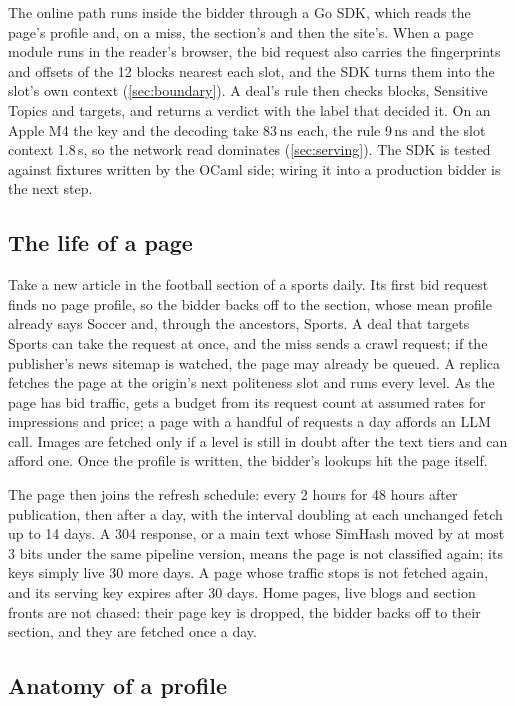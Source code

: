 The online path runs inside the bidder through a Go SDK, which reads the page's profile and, on a miss, the section's and then the site's. When a page module runs in the reader's browser, the bid request also carries the fingerprints and offsets of the 12 blocks nearest each slot, and the SDK turns them into the slot's own context (\cref{sec:boundary}). A deal's rule then checks blocks, Sensitive Topics and targets, and returns a verdict with the label that decided it. On an Apple M4 the key and the decoding take 83\,ns each, the rule 9\,ns and the slot context 1.8\,\textmu s, so the network read dominates (\cref{sec:serving}). The SDK is tested against fixtures written by the OCaml side; wiring it into a production bidder is the next step.

\subsection{The life of a page}\label{sec:overview-life}

Take a new article in the football section of a sports daily. Its first bid request finds no page profile, so the bidder backs off to the section, whose mean profile already says Soccer and, through the ancestors, Sports. A deal that targets Sports can take the request at once, and the miss sends a crawl request; if the publisher's news sitemap is watched, the page may already be queued. A replica fetches the page at the origin's next politeness slot and runs every level. As the page has bid traffic,  gets a budget from its request count at assumed rates for impressions and price; a page with a handful of requests a day affords an LLM call. Images are fetched only if a level is still in doubt after the text tiers and can afford one. Once the profile is written, the bidder's lookups hit the page itself.

The page then joins the refresh schedule: every 2 hours for 48 hours after publication, then after a day, with the interval doubling at each unchanged fetch up to 14 days. A 304 response, or a main text whose SimHash moved by at most 3 bits under the same pipeline version, means the page is not classified again; its keys simply live 30 more days. A page whose traffic stops is not fetched again, and its serving key expires after 30 days. Home pages, live blogs and section fronts are not chased: their page key is dropped, the bidder backs off to their section, and they are fetched once a day.

\subsection{Anatomy of a profile}\label{sec:overview-profile}

